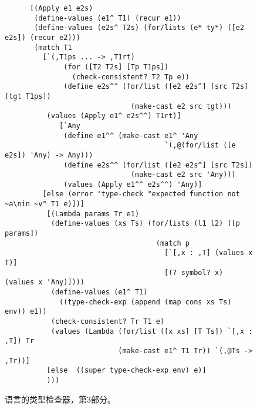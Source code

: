 \documentclass[11pt]{book}
\begin{document}
\begin{figure}[tbp]
\begin{lstlisting}
	  [(Apply e1 e2s)
	   (define-values (e1^ T1) (recur e1))
	   (define-values (e2s^ T2s) (for/lists (e* ty*) ([e2 e2s]) (recur e2)))
	   (match T1
	     [`(,T1ps ... -> ,T1rt)
              (for ([T2 T2s] [Tp T1ps])
                (check-consistent? T2 Tp e))
              (define e2s^^ (for/list ([e2 e2s^] [src T2s] [tgt T1ps])
                              (make-cast e2 src tgt)))
	      (values (Apply e1^ e2s^^) T1rt)]
             [`Any
              (define e1^^ (make-cast e1^ 'Any
                                      `(,@(for/list ([e e2s]) 'Any) -> Any)))
              (define e2s^^ (for/list ([e2 e2s^] [src T2s])
                              (make-cast e2 src 'Any)))
              (values (Apply e1^^ e2s^^) 'Any)]
	     [else (error 'type-check "expected function not ~a\nin ~v" T1 e)])]
          [(Lambda params Tr e1)
           (define-values (xs Ts) (for/lists (l1 l2) ([p params])
                                    (match p
                                      [`[,x : ,T] (values x T)]
                                      [(? symbol? x) (values x 'Any)])))
           (define-values (e1^ T1) 
             ((type-check-exp (append (map cons xs Ts) env)) e1))
           (check-consistent? Tr T1 e)
           (values (Lambda (for/list ([x xs] [T Ts]) `[,x : ,T]) Tr
                           (make-cast e1^ T1 Tr)) `(,@Ts -> ,Tr))]
          [else  ((super type-check-exp env) e)]
          )))
\end{lstlisting}
\caption{ \LangGrad{} 语言的类型检查器，第3部分。}
\label{fig:type-check-Rgradual-3}
\end{figure}
\end{document}
